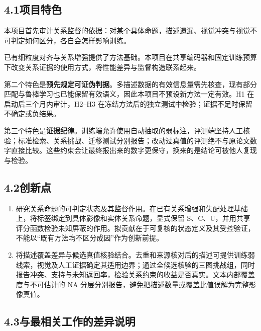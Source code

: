 
\subsection*{4.1\quad 项目特色}

本项目首先审计关系监督的依据：对某个具体命题，描述遗漏、视觉冲突与视觉不可判定如何区分，各自会怎样影响训练。

已有细粒度对齐与关系增强提供了方法基础。本项目在共享编码器和固定训练预算下改变关系证据的使用方式，将性能差异与监督构造联系起来。

第二个特色是\textbf{预先规定可证伪判据}。多描述数据的有效信息量需先核查\cite{lu2018rsicd,yuan2022amfmn}，现有部分匹配与鲁棒学习也已能保留有效语义\cite{pmpguard2026,hu2023rcl}，因此本项目不预设新方法一定有效。H1 在启动后三个月内审计，H2--H3 在冻结方法后的独立测试中检验；证据不足时保留不确定或负结果。

第三个特色是\textbf{证据纪律}。训练端允许使用自动抽取的弱标注，评测端坚持人工核验；标准检索、关系挑战、迁移测试分别报告；改动过真值的评测绝不与原论文数字直接比较。这些约束会让最终报出来的数字更保守，换来的是结论可被他人复现与检验。

\subsection*{4.2\quad 创新点}

\begin{enumerate}
    \item 研究关系命题的可判定状态及其监督作用。在已有关系增强\cite{zhang2023unimodal,shui2025esrn,wu2024scat,yang2024dove,mi2024knowledgeaware}和失配处理\cite{hu2023rcl,han2023msc,yang2023bicro,zhang2024npc,feng2024tripartition,pmpguard2026}基础上，将标签绑定到具体影像和实体关系命题，显式保留 S、C、U，并用共享评分函数检验未知屏蔽的作用。拟贡献在于可复核的状态定义及其受控验证，不能以“既有方法均不区分成因”作为创新前提。

    \item 将描述覆盖差异与候选真值核验结合。去重和来源核对后的描述可提供训练弱线索，视觉及人工证据确定其适用边界；通过全候选核验的三图挑战组，同时报告冲突、支持与未知返回率，检验关系约束的收益是否真实。文本内部覆盖度与不可估计的 NA 分层分别报告，避免把描述数量或覆盖比值误解为完整影像真值。
\end{enumerate}

\subsection*{4.3\quad 与最相关工作的差异说明}

